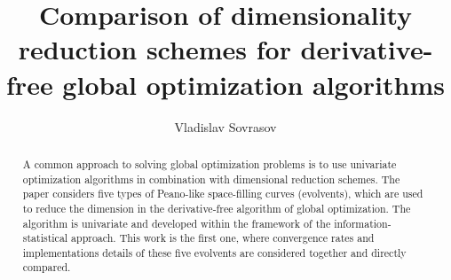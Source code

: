 \documentclass[3p,times,procedia]{elsarticle}
\begin{document}
\begin{frontmatter}



%

\title{Comparison of dimensionality reduction schemes for derivative-free global optimization
algorithms}




\author[a]{Vladislav Sovrasov}

\address[a]{Lobachevsky State University of Nizhni Novgorod, 23 Prospekt Gagarina (Gagarin Avenue), 603950 Nizhni Novgorod, Russia}

\begin{abstract}
  A common approach to solving global optimization problems is to use
  univariate optimization algorithms in combination with dimensional reduction schemes.
  The paper considers five types of Peano-like space-filling curves (evolvents), which are used
  to reduce the dimension in the derivative-free algorithm of global optimization. The algorithm
  is univariate and developed within the framework of the information-statistical approach.
  This work is the first one, where convergence rates and implementations details
  of these five evolvents are considered together and directly compared.
\end{abstract}


\end{frontmatter}
\end{document}
